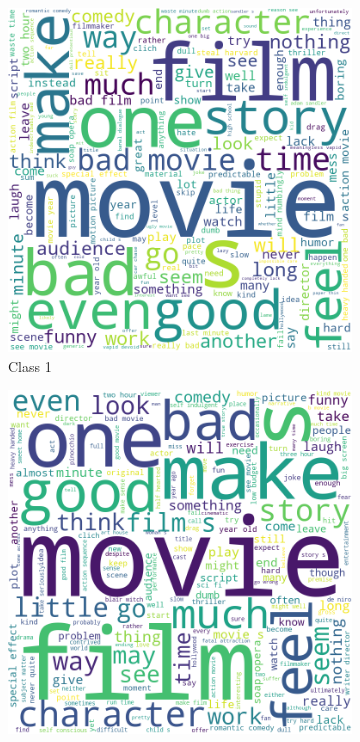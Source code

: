 \documentclass[10pt, a4paper]{article}
\begin{document}
\begin{figure}[h]
     \centering
     \begin{subfigure}[b]{0.18\textwidth}
         \centering
         \includegraphics[width=\textwidth]{lemma1.png}
         \caption{Class 1}
         \label{fig:lemma1cloud}
     \end{subfigure}
     \hfill
     \begin{subfigure}[b]{0.18\textwidth}
         \centering
         \includegraphics[width=\textwidth]{lemma2.png}

\end{subfigure}
\end{figure}
\end{document}
